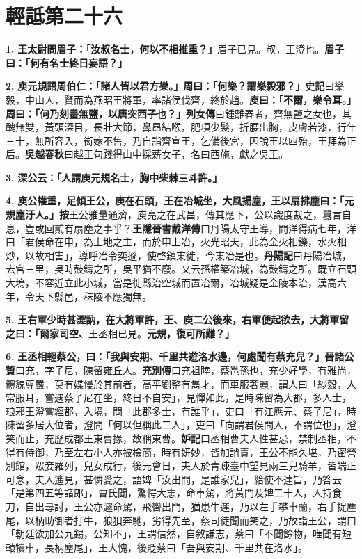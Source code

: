 \chapter{輕詆第二十六}

\textbf{1.} \textbf{王太尉問眉子：「汝叔名士，何以不相推重？」}{\footnotesize 眉子已見。叔，王澄也。}\textbf{眉子曰：「何有名士終日妄語？」}

\textbf{2.} \textbf{庾元規語周伯仁：「諸人皆以君方樂。」周曰：「何樂？謂樂毅邪？」}{\footnotesize \textbf{史記}曰樂毅，中山人，賢而為燕昭王將軍，率諸侯伐齊，終於趙。}\textbf{庾曰：「不爾，樂令耳。」周曰：「何乃刻畫無鹽，以唐突西子也？」}{\footnotesize \textbf{列女傳}曰鍾離春者，齊無鹽之女也，其醜無雙，黃頭深目，長壯大節，鼻昂結喉，肥項少髮，折腰出胸，皮膚若漆，行年三十，無所容入，衒嫁不售，乃自詣齊宣王，乞備後宮，因說王以四殆，王拜為正后。\textbf{吳越春秋}曰越王句踐得山中採薪女子，名曰西施，獻之吳王。}

\textbf{3.} \textbf{深公云：「人謂庾元規名士，胸中柴棘三斗許。」}

\textbf{4.} \textbf{庾公權重，足傾王公，庾在石頭，王在冶城坐，大風揚塵，王以扇拂塵曰：「元規塵汙人。」}{\footnotesize \textbf{按}王公雅量通濟，庾亮之在武昌，傳其應下，公以識度裁之，囂言自息，豈或回貳有扇塵之事乎？\textbf{王隱晉書戴洋傳}曰丹陽太守王導，問洋得病七年，洋曰「君侯命在申，為土地之主，而於申上冶，火光昭天，此為金火相鑠，水火相炒，以故相害」，導呼冶令奕遜，使啓鎮東徙，今東冶是也。\textbf{丹陽記}曰丹陽冶城，去宮三里，吳時鼓鑄之所，吳平猶不廢。又云孫權築冶城，為鼓鑄之所。既立石頭大塢，不容近立此小城，當是徙縣治空城而置冶爾，冶城疑是金陵本治，漢高六年，令天下縣邑，秣陵不應獨無。}

\textbf{5.} \textbf{王右軍少時甚澀訥，在大將軍許，王、庾二公後來，右軍便起欲去，大將軍留之曰：「爾家司空、}{\footnotesize 王丞相已見。}\textbf{元規，復可所難？」}

\textbf{6.} \textbf{王丞相輕蔡公，曰：「我與安期、千里共遊洛水邊，何處聞有蔡充兒？」}{\footnotesize \textbf{晉諸公贊}曰充，字子尼，陳留雍丘人。\textbf{充別傳}曰充祖睦，蔡邕孫也，充少好學，有雅尚，體貌尊嚴，莫有媟慢於其前者，高平劉整有雋才，而車服奢麗，謂人曰「紗縠，人常服耳，嘗遇蔡子尼在坐，終日不自安」，見憚如此，是時陳留為大郡，多人士，琅邪王澄嘗經郡，入境，問「此郡多士，有誰乎」，吏曰「有江應元、蔡子尼」，時陳留多居大位者，澄問「何以但稱此二人」，吏曰「向謂君侯問人，不謂位也」，澄笑而止，充歷成都王東曹掾，故稱東曹。\textbf{妒記}曰丞相曹夫人性甚忌，禁制丞相，不得有侍御，乃至左右小人亦被檢簡，時有妍妙，皆加誚責，王公不能久堪，乃密營別館，眾妾羅列，兒女成行，後元會日，夫人於青疎臺中望見兩三兒騎羊，皆端正可念，夫人遙見，甚憐愛之，語婢「汝出問，是誰家兒」，給使不達旨，乃答云「是第四五等諸郎」，曹氏聞，驚愕大恚，命車駕，將黃門及婢二十人，人持食刀，自出尋討，王公亦遽命駕，飛轡出門，猶患牛遲，乃以左手攀車蘭，右手捉麈尾，以柄助御者打牛，狼狽奔馳，劣得先至，蔡司徒聞而笑之，乃故詣王公，謂曰「朝廷欲加公九錫，公知不」，王謂信然，自敘謙志，蔡曰「不聞餘物，唯聞有短轅犢車，長柄麈尾」，王大愧，後貶蔡曰「吾與安期、千里共在洛水」。}

